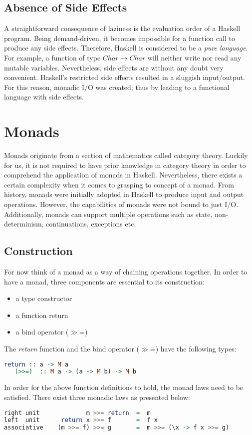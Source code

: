 \documentclass[a4paper, onecolumn]{article}
\begin{document}
\subsection{Absence of Side Effects}

A straightforward consequence of laziness is the evaluation order of a Haskell program. Being demand-driven, it becomes impossible for a function call to produce any side effects. Therefore, Haskell is considered to be a \textit{pure language}. For example, a function of type $Char \rightarrow Char$ will neither write nor read any mutable variables. Nevertheless, side effects are without any doubt very convenient. Haskell's restricted side effects resulted in a sluggish input/output. For this reason, monadic I/O was created; thus by leading to a functional language with side effects. 
\section{Monads}
Monads originate from a section of mathematics called category theory. Luckily for us, it is not required to have prior knowledge in category theory in order to comprehend the application of monads in Haskell. 
Nevertheless, there exists a certain complexity when it comes to grasping to concept of a monad. From history, monads were initially adopted in Haskell to produce input and output operations. However, the capabilities of monads were not bound to just I/O. Additionally, monads can support multiple operations such as state, non-determinism, continuations, exceptions etc.
\subsection{Construction}
For now think of a monad as a way of chaining operations together. 
In order to have a monad, three components are essential to its construction: 
\begin{itemize}
    \item a type constructor
    \item a function return
    \item a bind operator ($\gg$=)
\end{itemize}
The \textit{return} function and the bind operator ($\gg$=) have the following types: 
\begin{tcolorbox}
  \begin{lstlisting}[language=Haskell]
   return :: a -> M a 
   (>>=)  :: M a -> (a -> M b) -> M b 
  \end{lstlisting}
\end{tcolorbox}
In order for the above function definitions to hold, the monad laws need to be satisfied. There exist three monadic laws as presented below: 
\begin{tcolorbox}
  \begin{lstlisting}[language=Haskell]
right unit             m >>= return  =  m 
left  unit      return x >>= f       =  f x   
associative    (m >>= f) >>= g       =  m >>= (\x -> f x >>= g) 
  \end{lstlisting}
\end{tcolorbox}
\end{document}
